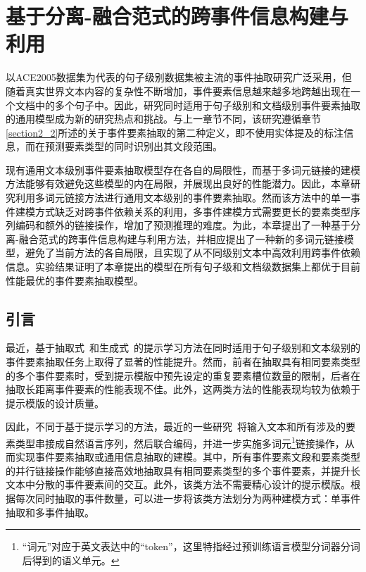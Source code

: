 \chapter{基于分离-融合范式的跨事件信息构建与利用}
\label{chap:chapter5}

以ACE2005数据集为代表的句子级别数据集被主流的事件抽取研究广泛采用，但随着真实世界文本内容的复杂性不断增加，事件要素信息越来越多地跨越出现在一个文档中的多个句子中。因此，研究同时适用于句子级别和文档级别事件要素抽取的通用模型成为新的研究热点和挑战。与上一章节不同，该研究遵循章节\ref{section2_2}所述的关于事件要素抽取的第二种定义，即不使用实体提及的标注信息，而在预测要素类型的同时识别出其文段范围。

现有通用文本级别事件要素抽取模型存在各自的局限性，而基于多词元链接的建模方法能够有效避免这些模型的内在局限，并展现出良好的性能潜力。因此，本章研究利用多词元链接方法进行通用文本级别的事件要素抽取。然而该方法中的单一事件建模方式缺乏对跨事件依赖关系的利用，多事件建模方式需要更长的要素类型序列编码和额外的链接操作，增加了预测推理的难度。为此，本章提出了一种基于分离-融合范式的跨事件信息构建与利用方法，并相应提出了一种新的多词元链接模型，避免了当前方法的各自局限，且实现了从不同级别文本中高效利用跨事件依赖信息。实验结果证明了本章提出的模型在所有句子级和文档级数据集上都优于目前性能最优的事件要素抽取模型。

\section{引言}
\label{introduction}

最近，基于抽取式~\cite{ma2022prompt, he2023revisiting, nguyen2023contextualized, li2023intra}和生成式~\cite{hsu2022degree,du2022dynamic,zhang2023overlap}的提示学习方法在同时适用于句子级别和文本级别的事件要素抽取任务上取得了显著的性能提升。然而，前者在抽取具有相同要素类型的多个事件要素时，受到提示模版中预先设定的重复要素槽位数量的限制，后者在抽取长距离事件要素的性能表现不佳。此外，这两类方法的性能表现均较为依赖于提示模版的设计质量。

因此，不同于基于提示学习的方法，最近的一些研究~\cite{wang2022query,lou2023universal,liu2023rexuie}将输入文本和所有涉及的要素类型串接成自然语言序列，然后联合编码，并进一步实施多词元\footnote{“词元”对应于英文表达中的“token”，这里特指经过预训练语言模型分词器分词后得到的语义单元。}链接操作，从而实现事件要素抽取或通用信息抽取的建模。其中，所有事件要素文段和要素类型的并行链接操作能够直接高效地抽取具有相同要素类型的多个事件要素，并提升长文本中分散的事件要素间的交互。此外，该类方法不需要精心设计的提示模版。根据每次同时抽取的事件数量，可以进一步将该类方法划分为两种建模方式：单事件抽取和多事件抽取。

